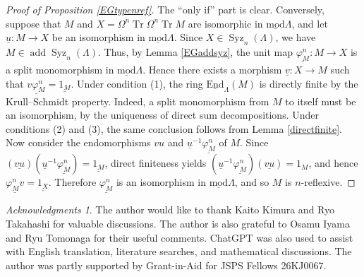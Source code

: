 \documentclass{amsart}
\theoremstyle{definition}
\theoremstyle{remark}
\newtheorem*{ac}{Acknowledgments}
\numberwithin{equation}{thm}
\def\add{\operatorname{add}}
\def\Endl{\operatorname{\underline{End}}}
\def\lmod{\operatorname{\underline{mod}}}
\def\syz{\Omega}
\def\Syz{\operatorname{Syz}}
\def\tr{\operatorname{Tr}}
\begin{document}
\begin{proof}[Proof of Proposition \ref{EGtypenref}]
The ``only if'' part is clear.
Conversely, suppose that $M$ and $X=\syz^n\tr\syz^n\tr M$ are isomorphic in $\lmod\Lambda$, and let $\underline{u}:M\to X$ be an isomorphism in $\lmod\Lambda$.
Since $X\in\Syz_n(\Lambda)$, we have $M\in\add\Syz_n(\Lambda)$.
Thus, by Lemma \ref{EGaddsyz}, the unit map $\underline{\varphi_M^n}:M\to X$ is a split monomorphism in $\lmod\Lambda$.
Hence there exists a morphism $\underline{v}:X\to M$ such that $\underline{v\varphi_M^n}=\underline{1_M}$.
Under condition (1), the ring $\Endl_\Lambda(M)$ is directly finite by the Krull--Schmidt property.
Indeed, a split monomorphism from $M$ to itself must be an isomorphism, by the uniqueness of direct sum decompositions.
Under conditions (2) and (3), the same conclusion follows from Lemma \ref{directfinite}.
Now consider the endomorphisms $vu$ and $\underline{u}^{-1}\underline{\varphi_M^n}$ of $M$.
Since $(\underline{vu})(\underline{u}^{-1}\underline{\varphi_M^n})=\underline{1_M}$, direct finiteness yields $(\underline{u}^{-1}\underline{\varphi_M^n})(\underline{vu})=1_M$, and hence $\underline{\varphi_M^n v}=\underline{1_X}$.
Therefore $\underline{\varphi_M^n}$ is an isomorphism in $\lmod\Lambda$, and so $M$ is $n$-reflexive.
\end{proof}
\begin{ac}
The author would like to thank Kaito Kimura and Ryo Takahashi for valuable discussions.
The author is also grateful to Osamu Iyama and Ryu Tomonaga for their useful comments.
ChatGPT was also used to assist with English translation, literature searches, and mathematical discussions.
The author was partly supported by Grant-in-Aid for JSPS Fellows 26KJ0067.
\end{ac}
\end{document}
